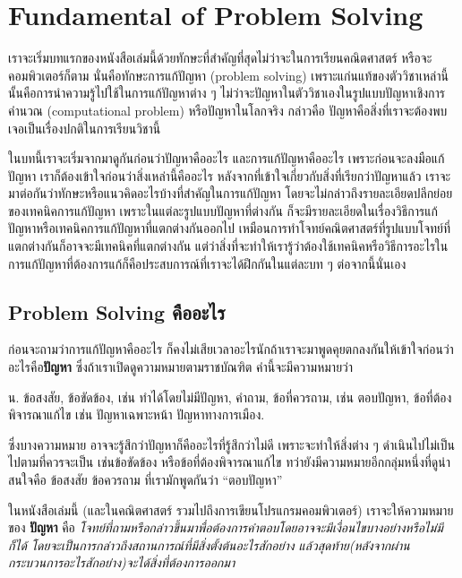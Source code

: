 \chapter{Fundamental of Problem Solving}

เราจะเริ่มบทแรกของหนังสือเล่มนี้ด้วยทักษะที่สำคัญที่สุดไม่ว่าจะในการเรียนคณิตศาสตร์ หรือจะคอมพิวเตอร์ก็ตาม นั่นคือทักษะการแก้ปัญหา (problem solving) เพราะแก่นแท้ของตัววิชาเหล่านี้นั้นคือการนำความรู้ไปใช้ในการแก้ปัญหาต่าง ๆ ไม่ว่าจะปัญหาในตัววิชาเองในรูปแบบปัญหาเชิงการคำนวณ (computational problem) หรือปัญหาในโลกจริง กล่าวคือ ปัญหาคือสิ่งที่เราจะต้องพบเจอเป็นเรื่องปกติในการเรียนวิชานี้

ในบทนี้เราจะเริ่มจากมาดูกันก่อนว่าปัญหาคืออะไร และการแก้ปัญหาคืออะไร เพราะก่อนจะลงมือแก้ปัญหา เราก็ต้องเข้าใจก่อนว่าสิ่งเหล่านี้คืออะไร หลังจากที่เข้าใจเกี่ยวกับสิ่งที่เรียกว่าปัญหาแล้ว เราจะมาต่อกันว่าทักษะหรือแนวคิดอะไรบ้างที่สำคัญในการแก้ปัญหา โดยจะไม่กล่าวถึงรายละเอียดปลีกย่อยของเทคนิคการแก้ปัญหา เพราะในแต่ละรูปแบบปัญหาที่ต่างกัน ก็จะมีรายละเอียดในเรื่องวิธีการแก้ปัญหาหรือเทคนิคการแก้ปัญหาที่แตกต่างกันออกไป เหมือนการทำโจทย์คณิตศาสตร์ที่รูปแบบโจทย์ที่แตกต่างกันก็อาจจะมีเทคนิคที่แตกต่างกัน แต่ว่าสิ่งที่จะทำให้เรารู้ว่าต้องใช้เทคนิคหรือวิธีการอะไรในการแก้ปัญหาที่ต้องการแก้ก็คือประสบการณ์ที่เราจะได้ฝึกกันในแต่ละบท ๆ ต่อจากนี้นั่นเอง

\section{Problem Solving คืออะไร}

ก่อนจะถามว่าการแก้ปัญหาคืออะไร ก็คงไม่เสียเวลาอะไรนักถ้าเราจะมาพูดคุยตกลงกันให้เข้าใจก่อนว่า อะไรคือ\textbf{ปัญหา} ซึ่งถ้าเราเปิดดูความหมายตามราชบัณฑิต คำนี้จะมีความหมายว่า
\begin{center}
	น. ข้อสงสัย, ข้อขัดข้อง, เช่น ทำได้โดยไม่มีปัญหา, คำถาม, ข้อที่ควรถาม, เช่น ตอบปัญหา, ข้อที่ต้องพิจารณาแก้ไข เช่น ปัญหาเฉพาะหน้า ปัญหาทางการเมือง.
\end{center}
ซึ่งบางความหมาย อาจจะรู้สึกว่าปัญหาก็คืออะไรที่รู้สึกว่าไม่ดี เพราะจะทำให้สิ่งต่าง ๆ ดำเนินไปไม่เป็นไปตามที่ควรจะเป็น เช่นข้อขัดข้อง หรือข้อที่ต้องพิจารณาแก้ไข ทว่ายังมีความหมายอีกกลุ่มหนึ่งที่ดูน่าสนใจคือ ข้อสงสัย ข้อควรถาม ที่เรามักพูดกันว่า ``ตอบปัญหา''

ในหนังสือเล่มนี้ (และในคณิตศาสตร์ รวมไปถึงการเขียนโปรแกรมคอมพิวเตอร์) เราจะให้ความหมายของ \textbf{ปัญหา} คือ \textit{โจทย์ที่ถามหรือกล่าวขึ้นมาพื่อต้องการคำตอบโดยอาจจะมีเงื่อนไขบางอย่างหรือไม่มีก็ได้ โดยจะเป็นการกล่าวถึงสถานการณ์ที่มีสิ่งตั้งต้นอะไรสักอย่าง แล้วสุดท้าย(หลังจากผ่านกระบวนการอะไรสักอย่าง)จะได้สิ่งที่ต้องการออกมา}


